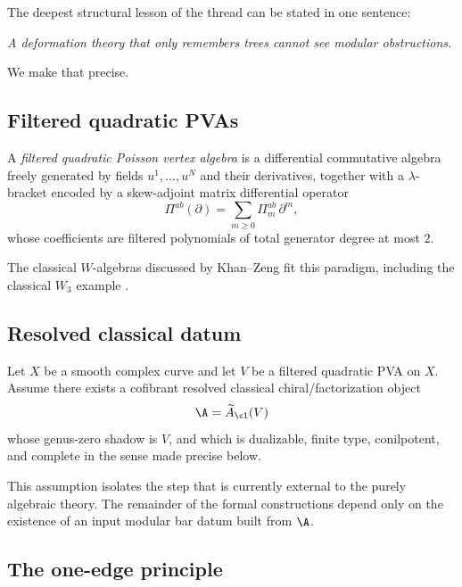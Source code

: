The deepest structural lesson of the thread can be stated in one sentence:

\begin{center}
\emph{A deformation theory that only remembers trees cannot see modular obstructions.}
\end{center}

We make that precise.

\subsection{Filtered quadratic PVAs}

\begin{definition}
A \emph{filtered quadratic Poisson vertex algebra} is a differential commutative algebra
freely generated by fields $u^1,\dots,u^N$ and their derivatives, together with a
$\lambda$-bracket encoded by a skew-adjoint matrix differential operator
\[
\Pi^{ab}(\partial)=\sum_{m\ge 0}\Pi^{ab}_m\,\partial^m,
\]
whose coefficients are filtered polynomials of total generator degree at most $2$.
\end{definition}

The classical $W$-algebras discussed by Khan--Zeng fit this paradigm, including the
classical $W_3$ example \cite{KZ25}.

\subsection{Resolved classical datum}

\begin{assumption}
Let $X$ be a smooth complex curve and let $V$ be a filtered quadratic PVA on $X$.
Assume there exists a cofibrant resolved classical chiral/factorization object
\[
\A=\widetilde A_{\cl}(V)
\]
whose genus-zero shadow is $V$, and which is dualizable, finite type, conilpotent,
and complete in the sense made precise below.
\end{assumption}

\begin{remark}
This assumption isolates the step that is currently external to the purely algebraic theory.
The remainder of the formal constructions depend only on the existence of an input
modular bar datum built from $\A$.
\end{remark}

\subsection{The one-edge principle}

